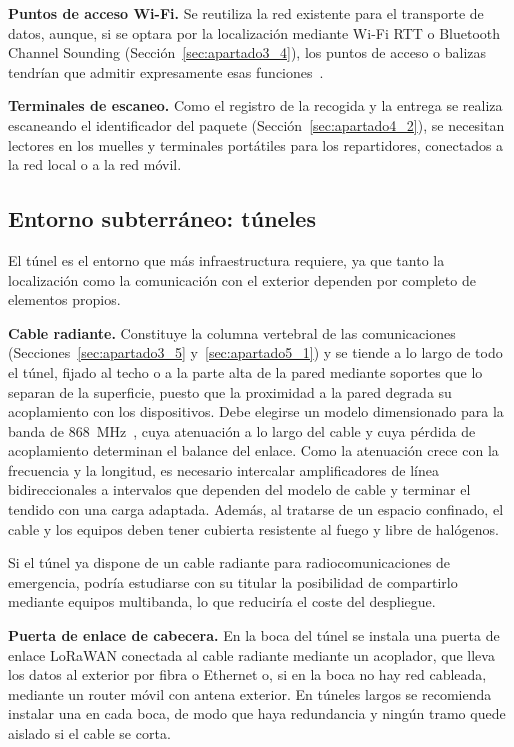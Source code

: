 \documentclass[11pt,a4paper]{article}
\begin{document}
\textbf{Puntos de acceso Wi-Fi.} Se reutiliza la red existente para el transporte de datos, aunque, si se optara por la localización mediante Wi-Fi RTT o Bluetooth Channel Sounding (Sección~\ref{sec:apartado3_4}), los puntos de acceso o balizas tendrían que admitir expresamente esas funciones~\cite{ref18,ref19}.

\textbf{Terminales de escaneo.} Como el registro de la recogida y la entrega se realiza escaneando el identificador del paquete (Sección~\ref{sec:apartado4_2}), se necesitan lectores en los muelles y terminales portátiles para los repartidores, conectados a la red local o a la red móvil.

\subsection{Entorno subterráneo: túneles}
\label{sec:apartado6_4}

El túnel es el entorno que más infraestructura requiere, ya que tanto la localización como la comunicación con el exterior dependen por completo de elementos propios.

\textbf{Cable radiante.} Constituye la columna vertebral de las comunicaciones (Secciones~\ref{sec:apartado3_5} y~\ref{sec:apartado5_1}) y se tiende a lo largo de todo el túnel, fijado al techo o a la parte alta de la pared mediante soportes que lo separan de la superficie, puesto que la proximidad a la pared degrada su acoplamiento con los dispositivos. Debe elegirse un modelo dimensionado para la banda de 868~MHz~\cite{ref20,ref31}, cuya atenuación a lo largo del cable y cuya pérdida de acoplamiento determinan el balance del enlace. Como la atenuación crece con la frecuencia y la longitud, es necesario intercalar amplificadores de línea bidireccionales a intervalos que dependen del modelo de cable y terminar el tendido con una carga adaptada. Además, al tratarse de un espacio confinado, el cable y los equipos deben tener cubierta resistente al fuego y libre de halógenos.

Si el túnel ya dispone de un cable radiante para radiocomunicaciones de emergencia, podría estudiarse con su titular la posibilidad de compartirlo mediante equipos multibanda, lo que reduciría el coste del despliegue.

\textbf{Puerta de enlace de cabecera.} En la boca del túnel se instala una puerta de enlace LoRaWAN conectada al cable radiante mediante un acoplador, que lleva los datos al exterior por fibra o Ethernet o, si en la boca no hay red cableada, mediante un router móvil con antena exterior. En túneles largos se recomienda instalar una en cada boca, de modo que haya redundancia y ningún tramo quede aislado si el cable se corta.
\end{document}
